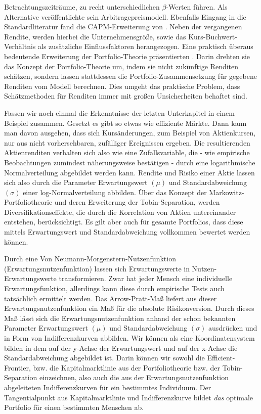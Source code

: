 Betrachtungszeiträume, zu recht unterschiedlichen $\beta$-Werten führen. Als Alternative veröffentlichte \textcite{Ross1976} sein Arbitragepreismodell. Ebenfalls Eingang in die Standardliteratur fand die CAPM-Erweiterung von \textcite{Fama1993}. Neben der vergangenen Rendite, werden hierbei die Unternehmensgröße, sowie das Kurs-Buchwert-Verhältnis als zusätzliche Einflussfaktoren herangezogen. Eine praktisch überaus bedeutende Erweiterung der Portfolio-Theorie präsentierten \textcite{Black1992}. Darin drehten sie das Konzept der Portfolio-Theorie um, indem sie nicht zukünftige Renditen schätzen, sondern lassen stattdessen die Portfolio-Zusammensetzung für gegebene Renditen vom Modell berechnen. Dies umgeht das praktische Problem, dass Schätzmethoden für Renditen immer mit großen Unsicherheiten behaftet sind.

Fassen wir noch einmal die Erkenntnisse der letzten Unterkapitel in einem Beispiel zusammen. Gesetzt es gibt so etwas wie effiziente Märkte. Dann kann man davon ausgehen, dass sich Kursänderungen, zum Beispiel von Aktienkursen, nur aus nicht vorhersehbaren, zufälliger Ereignissen ergeben. Die resultierenden Aktienrenditen verhalten sich also wie eine Zufallsvariable, die - wie empirische Beobachtungen zumindest näherungsweise bestätigen - durch eine logarithmische Normalverteilung abgebildet werden kann. Rendite und Risiko einer Aktie lassen sich also durch die Parameter Erwartungswert $(\mu)$ und Standardabweichung $(\sigma)$ einer log-Normalverteilung abbilden. Über das Konzept der Markowitz-Portfoliotheorie und deren Erweiterung der Tobin-Separation, werden Diversifikationseffekte, die durch die Korrelation von Aktien untereinander entstehen, berücksichtigt. Es gilt aber auch für gesamte Portfolios, dass diese mittels Erwartungswert und Standardabweichung vollkommen bewertet werden können.

Durch eine Von Neumann-Morgenstern-Nutzenfunktion (Erwartungsnutzenfunktion) lassen sich Erwartungswerte in Nutzen-Erwartungswerte transformieren. Zwar hat jeder Mensch eine individuelle Erwartungsfunktion, allerdings kann diese durch empirische Tests auch tatsächlich ermittelt werden. Das Arrow-Pratt-Maß liefert aus dieser Erwartungsnutzenfunktion ein Maß für die absolute Risikoaversion. Durch dieses Maß lässt sich die Erwartungsnutzenfunktion anhand der schon bekannten Parameter Erwartungswert $(\mu)$ und Standardabweichung $(\sigma)$ ausdrücken und in Form von Indifferenzkurven abbilden. Wir können als eine Koordinatensystem bilden in dem auf der y-Achse der Erwartungswert und auf der x-Achse die Standardabweichung abgebildet ist. Darin können wir sowohl die Efficient-Frontier, bzw. die Kapitalmarktlinie aus der Portfoliotheorie bzw. der Tobin-Separation einzeichnen, also auch die aus der Erwartungsnutzenfunktion abgeleiteten Indifferenzkurven für ein bestimmtes Individuum. Der Tangentialpunkt aus Kapitalmarktlinie und Indifferenzkurve bildet \textit{das} optimale Portfolio für einen bestimmten Menschen ab.

